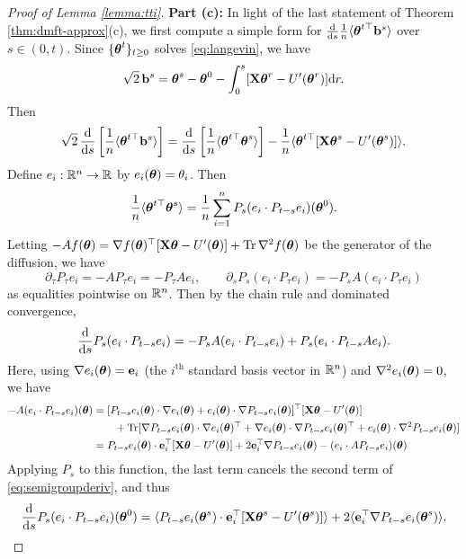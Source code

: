 \begin{proof}[Proof of Lemma \ref{lemma:tti}]
{\bf Part (c):} In light of the last statement of Theorem
\ref{thm:dmft-approx}(c), we first compute a simple form for
$\frac{\mathrm{d}}{\mathrm{d} s}\frac{1}{n}\langle\boldsymbol{\theta}^{t\top} \mathbf{b}^s \rangle$
over $s \in (0,t)$. Since
$\{\boldsymbol{\theta}^t\}_{t \geq 0}$ solves \eqref{eq:langevin}, we have
\[\sqrt{2}\,\mathbf{b}^s=\boldsymbol{\theta}^s-\boldsymbol{\theta}^0-\int_0^s [\mathbf{X}\boldsymbol{\theta}^r-U'(\boldsymbol{\theta}^r)]\mathrm{d} r.\]
Then
\begin{equation}\label{eq:thetabderiv}
\sqrt{2}\,\frac{\mathrm{d}}{\mathrm{d} s}
\left[\frac{1}{n}\langle\boldsymbol{\theta}^{t\top} \mathbf{b}^s \rangle\right]
=\frac{\mathrm{d}}{\mathrm{d} s}\left[\frac{1}{n}\langle \boldsymbol{\theta}^{t\top} \boldsymbol{\theta}^s
\rangle\right]-\frac{1}{n}\langle \boldsymbol{\theta}^{t\top}[\mathbf{X}\boldsymbol{\theta}^s-U'(\boldsymbol{\theta}^s)]
\rangle.
\end{equation}
Define $e_i:\mathbb{R}^n \to \mathbb{R}$ by $e_i(\boldsymbol{\theta})=\theta_i$. Then
\[\frac{1}{n}\langle \boldsymbol{\theta}^{t\top}\boldsymbol{\theta}^s \rangle
=\frac{1}{n}\sum_{i=1}^n P_s(e_i \cdot P_{t-s} e_i)(\boldsymbol{\theta}^0).\]
Letting
$-A f(\boldsymbol{\theta})=\nabla f(\boldsymbol{\theta})^\top [\mathbf{X}\boldsymbol{\theta}-U'(\boldsymbol{\theta})]
+\operatorname{Tr} \nabla^2 f(\boldsymbol{\theta})$
be the generator of the diffusion, we have
\[\partial_\tau P_\tau e_i={-}AP_\tau e_i={-}P_\tau Ae_i,
\qquad \partial_s P_s(e_i \cdot P_\tau e_i)
={-}P_sA(e_i \cdot P_\tau e_i)\]
as equalities pointwise on $\mathbb{R}^n$.
Then by the chain rule and dominated convergence,
\begin{equation}\label{eq:semigroupderiv}
\frac{\mathrm{d}}{\mathrm{d} s}P_s(e_i \cdot P_{t-s} e_i)
={-}P_s A(e_i \cdot P_{t-s} e_i)
+P_s(e_i \cdot P_{t-s} Ae_i).
\end{equation}
Here, using $\nabla e_i(\boldsymbol{\theta})=\mathbf{e}_i$ (the $i^\text{th}$ standard basis
vector in $\mathbb{R}^n$) and $\nabla^2 e_i(\boldsymbol{\theta})=0$, we have
\begin{align*}
{-}A(e_i \cdot P_{t-s}e_i)(\boldsymbol{\theta})
&=[P_{t-s}e_i(\boldsymbol{\theta}) \cdot \nabla e_i(\boldsymbol{\theta})
+e_i(\boldsymbol{\theta}) \cdot \nabla P_{t-s}e_i(\boldsymbol{\theta})]^\top[\mathbf{X}\boldsymbol{\theta}-U'(\boldsymbol{\theta})]\\
&\qquad+\operatorname{Tr}[\nabla P_{t-s}e_i(\boldsymbol{\theta}) \cdot \nabla e_i(\boldsymbol{\theta})^\top
+\nabla e_i(\boldsymbol{\theta}) \cdot \nabla P_{t-s}e_i(\boldsymbol{\theta})^\top
+e_i(\boldsymbol{\theta}) \cdot \nabla^2 P_{t-s}e_i(\boldsymbol{\theta})]\\
&=P_{t-s}e_i(\boldsymbol{\theta}) \cdot \mathbf{e}_i^\top[\mathbf{X}\boldsymbol{\theta}-U'(\boldsymbol{\theta})]
+2\mathbf{e}_i^\top \nabla P_{t-s}e_i(\boldsymbol{\theta})-(e_i \cdot AP_{t-s}e_i)(\boldsymbol{\theta})
\end{align*}
Applying $P_s$ to this function,
the last term cancels the second term of \eqref{eq:semigroupderiv}, and thus
\[\frac{\mathrm{d}}{\mathrm{d} s}P_s(e_i \cdot P_{t-s} e_i)(\boldsymbol{\theta}^0)
=\langle P_{t-s}e_i(\boldsymbol{\theta}^s) \cdot
\mathbf{e}_i^\top[\mathbf{X}\boldsymbol{\theta}^s-U'(\boldsymbol{\theta}^s)] \rangle
+2\langle \mathbf{e}_i^\top \nabla P_{t-s}e_i(\boldsymbol{\theta}^s) \rangle.\]

\end{proof}
